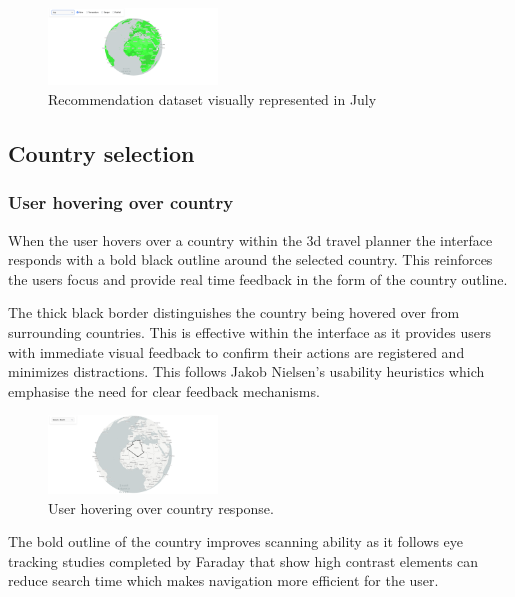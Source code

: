 \documentclass[]{project_final}
\begin{document}
\begin{figure}[ht!]
  \centering
  \includegraphics[width=0.4\textwidth]{7.png}
  \caption{Recommendation dataset visually represented in July}
  \label{fig:1}
\end{figure}

\subsection{Country selection}
\subsubsection{User hovering over country}
When the user hovers over a country within the 3d travel planner the interface responds with a bold black outline around the selected country. This reinforces the users focus and provide real time feedback in the form of the country outline.

The thick black border distinguishes the country being hovered over from surrounding countries. This is effective within the interface as it provides users with immediate visual feedback to confirm their actions are registered and minimizes distractions. This follows Jakob Nielsen's usability heuristics which emphasise the need for clear feedback mechanisms.

\begin{figure}[ht!]
  \centering
  \includegraphics[width=0.4\textwidth]{8.png}
  \caption{User hovering over country response.}
  \label{fig:1}
\end{figure}

The bold outline of the country improves scanning ability as it follows eye tracking studies completed by Faraday that show high contrast elements can reduce search time which makes navigation more efficient for the user.
\end{document}

